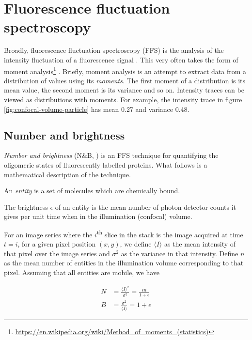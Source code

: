 \documentclass[12pt,]{book}
\let\rmarkdownfootnote\footnote%
\def\footnote{\protect\rmarkdownfootnote}
\theoremstyle{definition}
\theoremstyle{definition}
\theoremstyle{definition}
\theoremstyle{remark}
\let\BeginKnitrBlock\begin \let\EndKnitrBlock\end
\begin{document}
\section{Fluorescence fluctuation
spectroscopy}\label{fluorescence-fluctuation-spectroscopy}

Broadly, fluorescence fluctuation spectroscopy (FFS) is the analysis of
the intensity fluctuation of a fluorescence signal \citep{FFS}. This
very often takes the form of moment analysis\footnote{\url{https://en.wikipedia.org/wiki/Method_of_moments_(statistics)}}
\citep{QianElson}. Briefly, moment analysis is an attempt to extract
data from a distribution of values using its \emph{moments}. The first
moment of a distribution is its mean value, the second moment is its
variance and so on. Intensity traces can be viewed as distributions with
moments. For example, the intensity trace in figure
\ref{fig:confocal-volume-particle} has mean 0.27 and variance 0.48.

\subsection{Number and brightness}\label{number-and-brightness}

\emph{Number and brightness} (N\&B, \citet{NB}) is an FFS technique for
quantifying the oligomeric states of fluorescently labelled proteins.
What follows is a mathematical description of the technique.

\BeginKnitrBlock{definition}
\protect\hypertarget{def:unnamed-chunk-5}{}{\label{def:unnamed-chunk-5} }An
\emph{entity} is a set of molecules which are chemically bound.
\EndKnitrBlock{definition}

\BeginKnitrBlock{definition}
\protect\hypertarget{def:unnamed-chunk-6}{}{\label{def:unnamed-chunk-6} }The
brightness \(\epsilon\) of an entity is the mean number of photon
detector counts it gives per unit time when in the illumination
(confocal) volume.
\EndKnitrBlock{definition} For an image series where the
\(i\)\textsuperscript{th} slice in the stack is the image acquired at
time \(t = i\), for a given pixel position \((x, y)\), we define
\(\langle I \rangle\) as the mean intensity of that pixel over the image
series and \(\sigma^2\) as the variance in that intensity. Define \(n\)
as the mean number of entities in the illumination volume corresponding
to that pixel. Assuming that all entities are mobile, we have

\begin{align}
N &= \frac{\langle I \rangle^2}{\sigma^2} = \frac{\epsilon n}{1 + \epsilon} \label{eq:NB1-1} \\
B &= \frac{\sigma^2}{\langle I \rangle} = 1 + \epsilon \label{eq:NB1-2}
\end{align}
\end{document}
